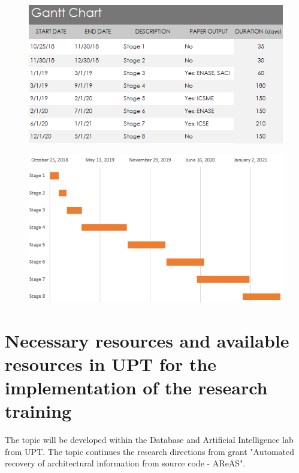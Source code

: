 \documentclass[12pt,a4paper,oneside]{report}
\begin{document}
\begin{figure}[h]
\centering
\includegraphics[width=\textwidth]{gantt_chart.PNG}
\label{fig:gantt1}
\end{figure}

\begin{figure}[h]
\centering
\includegraphics[width=\textwidth]{gantt_plot.PNG}
\label{fig:gantt2}
\end{figure}


\chapter{Necessary resources and available resources in UPT for the implementation of the research training}

The topic will be developed within the Database and Artificial Intelligence lab from UPT. The topic continues the research directions from grant "Automated recovery of architectural information from source code - AReAS".



\end{document}
